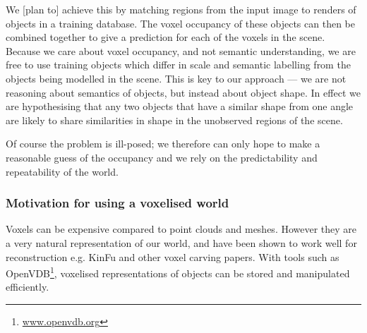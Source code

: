 \documentclass[10pt,a4paper, twocolumn]{article}
\makeatletter
\newcommand*{\eg}{e.g.\@\xspace}
\makeatother
\begin{document}
We [plan to] achieve this by matching regions from the input image to renders of objects in a training database.
The voxel occupancy of these objects can then be combined together to give a prediction for each of the voxels in the scene. 
Because we care about voxel occupancy, and not semantic understanding, we are free to use training objects which differ in scale and semantic labelling from the objects being modelled in the scene. 
This is key to our approach --- we are not reasoning about semantics of objects, but instead about object shape.
In effect we are hypothesising that any two objects that have a similar shape from one angle are likely to share similarities in shape in the unobserved regions of the scene.

Of course the problem is ill-posed; we therefore can only hope to make a reasonable guess of the occupancy and we rely on the predictability and repeatability of the world.






\subsubsection{Motivation for using a voxelised world}

Voxels can be expensive compared to point clouds and meshes. 
However they are a very natural representation of our world, and have been shown to work well for reconstruction \eg KinFu and other voxel carving papers. 
With tools such as OpenVDB\footnote{\url{www.openvdb.org}}, voxelised representations of objects can be stored and manipulated efficiently.

\end{document}
